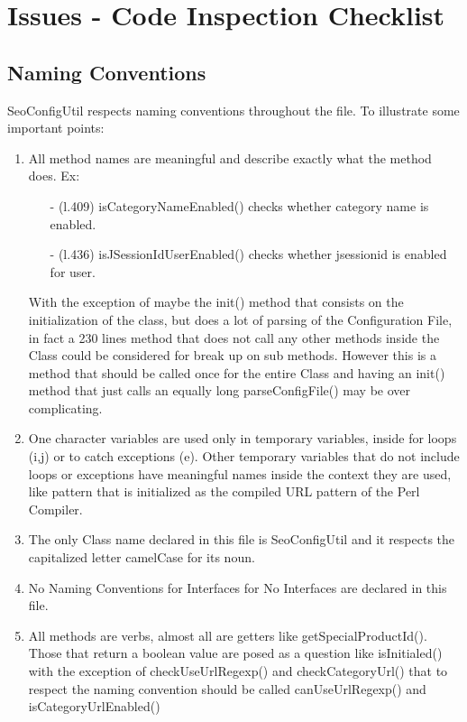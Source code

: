 \documentclass[a4paper]{article}
\begin{document}
\section{Issues - Code Inspection Checklist}
\subsection{Naming Conventions}
SeoConfigUtil respects naming conventions throughout the file. To illustrate some important points:
\begin{enumerate}
\item All method names are meaningful and describe exactly what the method does. Ex: 
\begin{itemize}
\item[-] (l.409) \ttfamily isCategoryNameEnabled() \rmfamily checks whether category name is enabled.
\item[-] (l.436) \ttfamily isJSessionIdUserEnabled() \rmfamily checks whether jsessionid is enabled for user.	
\end{itemize}
With the exception of maybe the \ttfamily init() \rmfamily method that consists on the initialization of the class, but does a lot of parsing of the Configuration File, in fact a 230 lines method that does not call any other methods inside the Class could be considered for break up on sub methods. However this is a method that should be called once for the entire Class and having an \ttfamily init() \rmfamily method that just calls an equally long \ttfamily parseConfigFile() \rmfamily may be over complicating.

\item One character variables are used only in temporary variables, inside \ttfamily for \rmfamily loops (\ttfamily i,j\rmfamily) or to catch exceptions  (\ttfamily e\rmfamily). Other temporary variables that do not include loops or exceptions have meaningful names inside the context they are used, like \ttfamily pattern \rmfamily that is initialized as the compiled URL pattern of the Perl Compiler.

\item The only Class name declared in this file is \ttfamily SeoConfigUtil \rmfamily and it respects the capitalized letter camelCase for its noun. 

\item No Naming Conventions for Interfaces for No Interfaces are declared in this file.

\item All methods are verbs, almost all are getters like \ttfamily getSpecialProductId()\rmfamily. Those that return a \ttfamily boolean \rmfamily value are posed as a question like \ttfamily isInitialed() \rmfamily  with the exception of \ttfamily checkUseUrlRegexp() \rmfamily and \ttfamily checkCategoryUrl() \rmfamily that to respect the naming convention should be called  \ttfamily canUseUrlRegexp() \rmfamily and \ttfamily isCategoryUrlEnabled() \rmfamily


\end{enumerate}
\end{document}
